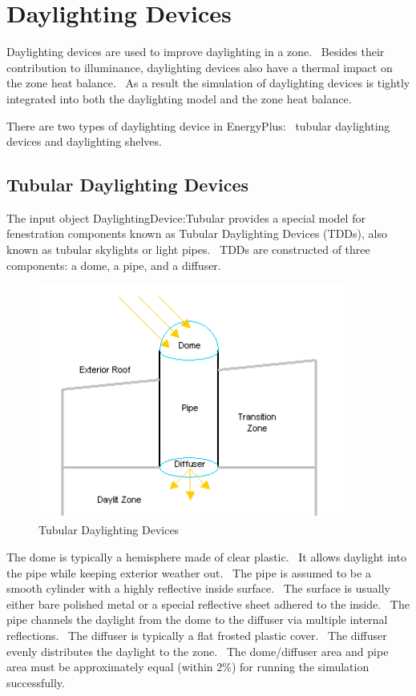 \section{Daylighting Devices}\label{daylighting-devices}

Daylighting devices are used to improve daylighting in a zone.~ Besides their contribution to illuminance, daylighting devices also have a thermal impact on the zone heat balance.~ As a result the simulation of daylighting devices is tightly integrated into both the daylighting model and the zone heat balance.

There are two types of daylighting device in EnergyPlus:~ tubular daylighting devices and daylighting shelves.

\subsection{Tubular Daylighting Devices}\label{tubular-daylighting-devices}

The input object DaylightingDevice:Tubular provides a special model for fenestration components known as Tubular Daylighting Devices (TDDs), also known as tubular skylights or light pipes.~ TDDs are constructed of three components: a dome, a pipe, and a diffuser.

\begin{figure}[hbtp] %
\centering
\includegraphics[width=0.9\textwidth, height=0.9\textheight, keepaspectratio=true]{media/image869.png}
\caption{  Tubular Daylighting Devices \protect \label{fig:tubular-daylighting-devices}}
\end{figure}

The dome is typically a hemisphere made of clear plastic.~ It allows daylight into the pipe while keeping exterior weather out.~ The pipe is assumed to be a smooth cylinder with a highly reflective inside surface.~ The surface is usually either bare polished metal or a special reflective sheet adhered to the inside.~ The pipe channels the daylight from the dome to the diffuser via multiple internal reflections.~ The diffuser is typically a flat frosted plastic cover.~ The diffuser evenly distributes the daylight to the zone.~ The dome/diffuser area and pipe area must be approximately equal (within 2\%) for running the simulation successfully.

